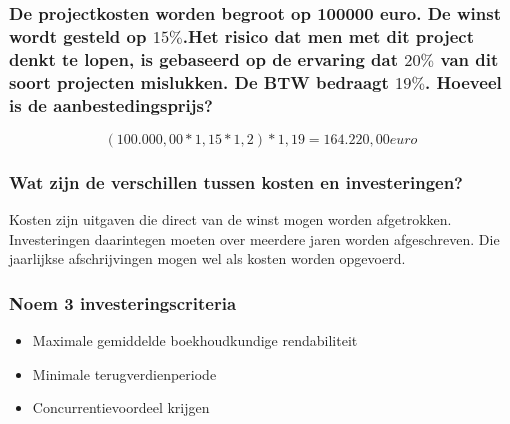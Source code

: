 \documentclass[a4paper,titlepage]{artikel1}
\begin{document}
   \subsubsection[Opdracht 1]{De projectkosten worden begroot op
   100000 euro. De winst wordt gesteld op $15\%$.Het risico dat men met dit
   project denkt te lopen, is gebaseerd op de ervaring dat $20\%$ van dit
   soort projecten mislukken. De BTW bedraagt $19\%$. Hoeveel is de
   aanbestedingsprijs?}
   \begin{displaymath}
    (100.000,00*1,15*1,2)*1,19={164.220,00}euro
   \end{displaymath}
   
   \subsubsection[Opdracht 2]{Wat zijn de verschillen tussen kosten en investeringen?}
   Kosten zijn uitgaven die direct van de winst mogen worden afgetrokken. Investeringen daarintegen moeten over meerdere jaren worden afgeschreven. Die jaarlijkse afschrijvingen mogen wel als kosten worden opgevoerd.
   
   \subsubsection[Opdracht 3]{Noem 3 investeringscriteria}
   \begin{itemize}
    \item Maximale gemiddelde boekhoudkundige rendabiliteit
    \item Minimale terugverdienperiode
    \item Concurrentievoordeel krijgen
   \end{itemize}
\end{document}
